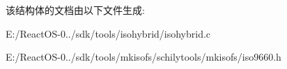 该结构体的文档由以下文件生成\+:\begin{DoxyCompactItemize}
\item 
E\+:/\+React\+O\+S-\/0../sdk/tools/isohybrid/isohybrid.\+c\item 
E\+:/\+React\+O\+S-\/0../sdk/tools/mkisofs/schilytools/mkisofs/iso9660.\+h\end{DoxyCompactItemize}
